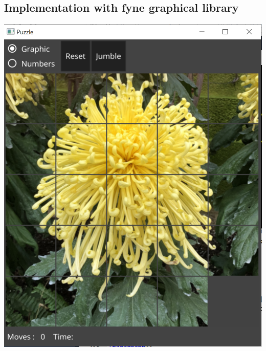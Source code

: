 \documentclass[a4paper,12pt]{article}
\theoremstyle{mytheor}
\begin{document}
\subsection*{Implementation with fyne graphical library}
\includegraphics[width=6in]{fyne_5_begin.png}
\end{document}
